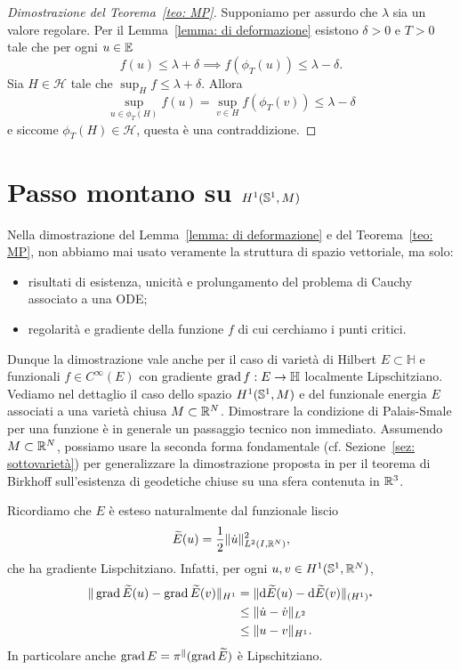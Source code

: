 	\begin{proof}[Dimostrazione del Teorema~\ref{teo: MP}]
		Supponiamo per assurdo che \( \lambda \) sia un valore regolare. Per il Lemma~\ref{lemma: di deformazione} esistono \(\delta>0\) e \(T>0\) tale che per ogni \(u \in \mathbb{E}\)
		\[
		f(u)\leq \lambda +\delta \implies f(\phi_T(u)) \leq \lambda -\delta.
		\]
		Sia \(H \in \mathcal{H}\) tale che \(\sup_H f \leq \lambda + \delta\). Allora 
		\[
		\sup_{u \in \phi_T(H)} f(u) = \sup_{v \in H} f(\phi_T(v)) \leq \lambda -\delta 
		\]
		e siccome \(\phi_T(H) \in \mathcal{H}\), questa è una contraddizione. 
	\end{proof}


\section{Passo montano su \texorpdfstring{$H^1(\mathbb{S}^1,M)$}{H1(S1,M)}}\label{sez: MP con energia}

Nella dimostrazione del Lemma~\ref{lemma: di deformazione} e del Teorema~\ref{teo: MP}, non abbiamo mai usato veramente la struttura di spazio vettoriale, ma solo:
\begin{itemize}
	\item risultati di esistenza, unicità e prolungamento del problema di Cauchy associato a una ODE;
	\item regolarità e gradiente della funzione \(f\) di cui cerchiamo i punti critici.
\end{itemize}
Dunque la dimostrazione vale anche per il caso di varietà di Hilbert \(E \subset \mathbb{H}\) e funzionali \(f \in C^\infty(E)\) con gradiente \(\operatorname{grad} f: E \to \mathbb{H}\) localmente Lipschitziano. Vediamo nel dettaglio il caso dello spazio \(H^1(\mathbb{S}^1,M)\) e del funzionale energia \(E\) associati a una varietà chiusa \(M \subset \mathbb{R}^N\). Dimostrare la condizione di Palais-Smale per una funzione è in generale un passaggio tecnico non immediato. Assumendo \(M \subset \mathbb{R}^N\), possiamo usare la seconda forma fondamentale (cf. Sezione~\ref{sez: sottovarietà}) per generalizzare la dimostrazione proposta in \cite[Theorem~4.4]{struwe2008variational} per il teorema di Birkhoff sull'esistenza di geodetiche chiuse su una sfera contenuta in \(\mathbb{R}^3\). 

Ricordiamo che \(E\) è esteso naturalmente dal funzionale liscio
\[
	\widetilde{E}(u) = \frac{1}{2} \|\dot u \|_{L^2(I,\mathbb{R}^N)}^2,
\]
che ha gradiente Lispchitziano. Infatti, per ogni \(u,v \in H^1(\mathbb{S}^1,\mathbb{R}^N)\),
\begin{align*}
	\| \operatorname{grad} \widetilde{E}(u)-\operatorname{grad} \widetilde{E}(v)\|_{H^1} &= \| \mathrm{d} \widetilde{E}(u)-\mathrm{d} \widetilde{E}(v)\|_{(H^1)^*} \\
	&\leq \|\dot u- \dot v\|_{L^2} \\
	&\leq \|u-v\|_{H^1}.
\end{align*}
In particolare anche \(\operatorname{grad} E = \pi^\parallel(\operatorname{grad} \widetilde{E})\) è Lipschitziano.

